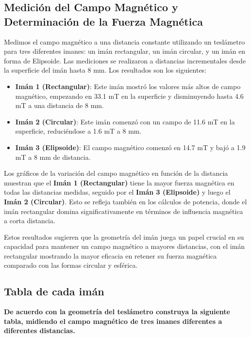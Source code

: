 \subsection{Medición del Campo Magnético y Determinación de la Fuerza Magnética}
Medimos el campo magnético a una distancia constante utilizando un teslámetro para tres diferentes imanes: un imán rectangular, un imán circular, y un imán en forma de Elipsoide. Las mediciones se realizaron a distancias incrementales desde la superficie del imán hasta 8 mm. Los resultados son los siguientes:

\begin{itemize}
    \item \textbf{Imán 1 (Rectangular)}: Este imán mostró los valores más altos de campo magnético, empezando en 33.1 mT en la superficie y disminuyendo hasta 4.6 mT a una distancia de 8 mm.
    \item \textbf{Imán 2 (Circular)}: Este imán comenzó con un campo de 11.6 mT en la superficie, reduciéndose a 1.6 mT a 8 mm.
    \item \textbf{Imán 3 (Elipsoide)}: El campo magnético comenzó en 14.7 mT y bajó a 1.9 mT a 8 mm de distancia.
\end{itemize}

Los gráficos de la variación del campo magnético en función de la distancia muestran que el \textbf{Imán 1 (Rectangular)} tiene la mayor fuerza magnética en todas las distancias medidas, seguido por el \textbf{Imán 3 (Elipsoide)} y luego el \textbf{Imán 2 (Circular)}. Esto se refleja también en los cálculos de potencia, donde el imán rectangular domina significativamente en términos de influencia magnética a corta distancia.

Estos resultados sugieren que la geometría del imán juega un papel crucial en su capacidad para mantener un campo magnético a mayores distancias, con el imán rectangular mostrando la mayor eficacia en retener su fuerza magnética comparado con las formas circular y esférica.

\subsection{Tabla de cada imán}
\textbf{De acuerdo con la geometría del teslámetro construya la siguiente tabla, midiendo
el campo magnético de tres imanes diferentes a diferentes distancias.}

